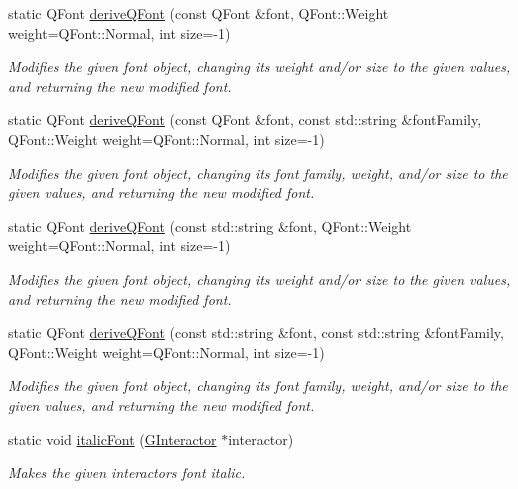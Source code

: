 \begin{DoxyCompactItemize}
static Q\+Font \mbox{\hyperlink{classsgl_1_1GFont_ac36fbf8f4ebf4558559f98d54277529f}{derive\+Q\+Font}} (const Q\+Font \&font, Q\+Font\+::\+Weight weight=Q\+Font\+::\+Normal, int size=-\/1)
\begin{DoxyCompactList}\small\item\em Modifies the given font object, changing its weight and/or size to the given values, and returning the new modified font. \end{DoxyCompactList}\item 
static Q\+Font \mbox{\hyperlink{classsgl_1_1GFont_aa0a91decdb8d9bec6e875ebac9d81c97}{derive\+Q\+Font}} (const Q\+Font \&font, const std\+::string \&font\+Family, Q\+Font\+::\+Weight weight=Q\+Font\+::\+Normal, int size=-\/1)
\begin{DoxyCompactList}\small\item\em Modifies the given font object, changing its font family, weight, and/or size to the given values, and returning the new modified font. \end{DoxyCompactList}\item 
static Q\+Font \mbox{\hyperlink{classsgl_1_1GFont_a6fdde28adfdce9b43b7eb4d4a47ca23b}{derive\+Q\+Font}} (const std\+::string \&font, Q\+Font\+::\+Weight weight=Q\+Font\+::\+Normal, int size=-\/1)
\begin{DoxyCompactList}\small\item\em Modifies the given font object, changing its weight and/or size to the given values, and returning the new modified font. \end{DoxyCompactList}\item 
static Q\+Font \mbox{\hyperlink{classsgl_1_1GFont_a50c41ebc7de0a4a038852b0764d3a6f2}{derive\+Q\+Font}} (const std\+::string \&font, const std\+::string \&font\+Family, Q\+Font\+::\+Weight weight=Q\+Font\+::\+Normal, int size=-\/1)
\begin{DoxyCompactList}\small\item\em Modifies the given font object, changing its font family, weight, and/or size to the given values, and returning the new modified font. \end{DoxyCompactList}\item 
static void \mbox{\hyperlink{classsgl_1_1GFont_a3f37291f3e288376754c056a10b64f90}{italic\+Font}} (\mbox{\hyperlink{classsgl_1_1GInteractor}{G\+Interactor}} $\ast$interactor)
\begin{DoxyCompactList}\small\item\em Makes the given interactor\textquotesingle{}s font italic. \end{DoxyCompactList}\item 

\end{DoxyCompactItemize}
